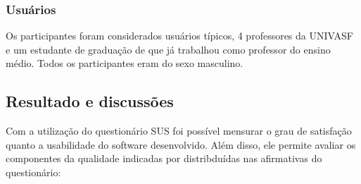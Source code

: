 \subsubsection{Usuários}

Os participantes foram considerados usuários típicos, 4 professores da UNIVASF e
um estudante de graduação de que já trabalhou como professor do ensino médio. Todos os
participantes eram do sexo masculino.

\subsection{Resultado e discussões}

Com a utilização do questionário SUS foi possível mensurar o grau de satisfação quanto
a usabilidade do software desenvolvido. Além disso, ele permite avaliar os componentes da
qualidade indicadas por  distribduídas nas afirmativas do questionário:


